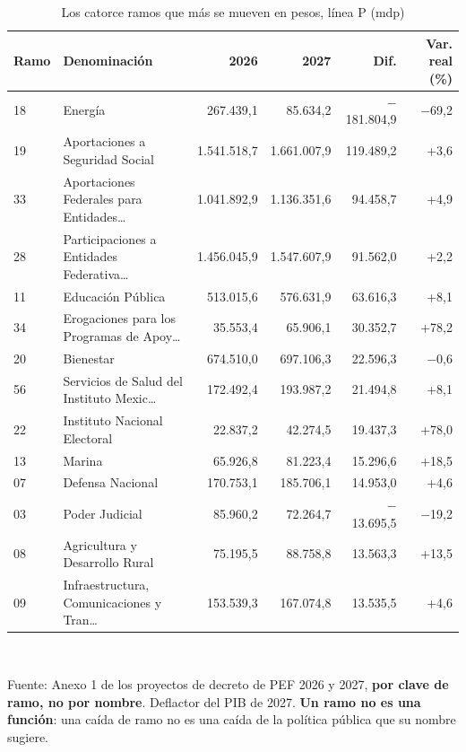 \begin{table}[htbp]\centering\footnotesize
\caption{Los catorce ramos que más se mueven en pesos, línea P (mdp)}\label{cua:ramos}
\begin{tabular}{llrrrr}
\toprule
Ramo & Denominación & 2026 & 2027 & Dif. & Var. real (\%) \\
\midrule
18 & Energía & 267.439,1 & 85.634,2 & $-$181.804,9 & $-$69,2 \\
19 & Aportaciones a Seguridad Social & 1.541.518,7 & 1.661.007,9 & 119.489,2 & +3,6 \\
33 & Aportaciones Federales para Entidades… & 1.041.892,9 & 1.136.351,6 & 94.458,7 & +4,9 \\
28 & Participaciones a Entidades Federativa… & 1.456.045,9 & 1.547.607,9 & 91.562,0 & +2,2 \\
11 & Educación Pública & 513.015,6 & 576.631,9 & 63.616,3 & +8,1 \\
34 & Erogaciones para los Programas de Apoy… & 35.553,4 & 65.906,1 & 30.352,7 & +78,2 \\
20 & Bienestar & 674.510,0 & 697.106,3 & 22.596,3 & $-$0,6 \\
56 & Servicios de Salud del Instituto Mexic… & 172.492,4 & 193.987,2 & 21.494,8 & +8,1 \\
22 & Instituto Nacional Electoral & 22.837,2 & 42.274,5 & 19.437,3 & +78,0 \\
13 & Marina & 65.926,8 & 81.223,4 & 15.296,6 & +18,5 \\
07 & Defensa Nacional & 170.753,1 & 185.706,1 & 14.953,0 & +4,6 \\
03 & Poder Judicial & 85.960,2 & 72.264,7 & $-$13.695,5 & $-$19,2 \\
08 & Agricultura y Desarrollo Rural & 75.195,5 & 88.758,8 & 13.563,3 & +13,5 \\
09 & Infraestructura, Comunicaciones y Tran… & 153.539,3 & 167.074,8 & 13.535,5 & +4,6 \\
\bottomrule
\end{tabular}
\\[2pt]\begin{minipage}{0.92\textwidth}\scriptsize Fuente: Anexo 1 de los proyectos de decreto de PEF 2026 y 2027, \textbf{por clave de ramo, no por nombre}. Deflactor del PIB de 2027. \textbf{Un ramo no es una función}: una caída de ramo no es una caída de la política pública que su nombre sugiere.\end{minipage}
\end{table}
